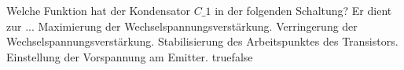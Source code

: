     {Welche Funktion hat der Kondensator $C\_1$ in der folgenden Schaltung? Er dient zur ...}
    {Maximierung der Wechselspannungsverstärkung.}
    {Verringerung der Wechselspannungsverstärkung.}
    {Stabilisierung des Arbeitspunktes des Transistors.}
    {Einstellung der Vorspannung am Emitter.}
    {true}{false}